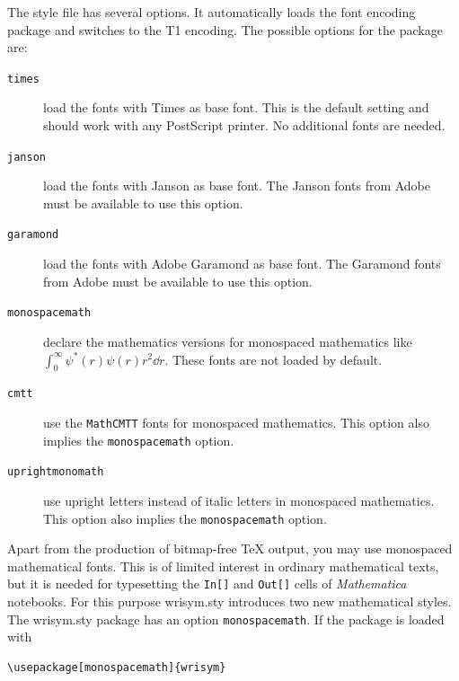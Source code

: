 \documentclass{article}
\newcommand{\Janson}[1]{{\fontfamily{pjn}\fontencoding{T1}%
\fontshape{n}\selectfont #1}}
\newcommand{\Garamond}[1]{{\fontfamily{pad}\fontencoding{T1}%
\fontshape{n}\selectfont #1}}
\newcommand{\Times}[1]{{\fontfamily{ptm}\fontencoding{T1}%
\fontshape{n}\selectfont #1}}
\newcommand{\cmtt}{\texttt{MathCMTT}\xspace}
\newcommand{\Math}{\textit{Mathematica}\xspace}
\begin{document}
The style file has several options. It automatically loads the font
encoding package and switches to the T1 encoding.  The possible
options for the package are:
\begin{description}
\item[{\normalfont\texttt{times}}]  load the fonts with \Times{Times} as base font.
      This is the default setting and should work with any PostScript
      printer. No additional fonts are needed.

\item[{\normalfont\texttt{janson}}] load the fonts with \Janson{Janson} as base font.
      The Janson fonts from Adobe must be available to use this option.
      
\item[{\normalfont\texttt{garamond}}] load the fonts with \Garamond{Adobe Garamond} as 
      base font. The Garamond fonts from Adobe must be available to use 
      this option.

\item[{\normalfont\texttt{monospacemath}}] declare the mathematics versions for
      monospaced mathematics like 
      $\int_0^\infty \psi^*(r)\psi(r) r^2 \dd r$.   
       These fonts are not loaded by
      default.
      
\item[{\normalfont\texttt{cmtt}}] use the \cmtt fonts for monospaced mathematics.      
     This option also implies the \texttt{monospacemath}
     option.
\item[{\normalfont\texttt{uprightmonomath}}] use upright letters instead of italic
    letters in monospaced mathematics. This option also implies 
     the \texttt{monospacemath} option.
\end{description}


Apart from the production of bitmap-free \TeX{} output, you may use
monospaced mathematical fonts. This is of limited interest in ordinary
mathematical texts, but it is needed for typesetting the \texttt{In[]}
and \texttt{Out[]} cells of \Math{} notebooks.  For this purpose
\textsf{wrisym.sty} introduces two new mathematical styles.  The
\textsf{wrisym.sty} package has an option \texttt{monospacemath}.  If
the package is loaded with

\begin{verbatim}
\usepackage[monospacemath]{wrisym}
\end{verbatim}
\end{document}

